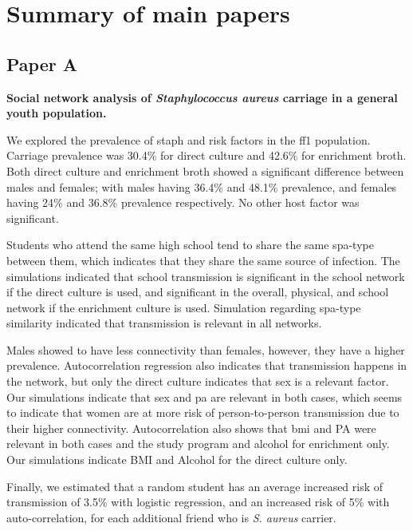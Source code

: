 \chapter{Summary of main papers}
\label{chapter:summay}
\section{Paper A}

\textbf{Social network analysis of \textit{Staphylococcus aureus} carriage in a general youth population.}

We explored the prevalence of \gls{staph} and risk factors in the \gls{ff1} population. Carriage prevalence was 30.4\% for direct culture and 42.6\% for enrichment broth. Both direct culture and enrichment broth showed a significant difference between males and females; with males having 36.4\% and 48.1\% prevalence, and females having 24\% and 36.8\% prevalence respectively. No other host factor was significant.

Students who attend the same high school tend to share the same \gls{spa}-type between them, which indicates that they share the same source of infection. The simulations indicated that school transmission is significant in the school network if the direct culture is used, and significant in the overall, physical, and school network if the enrichment culture is used. Simulation regarding \gls{spa}-type similarity indicated that transmission is relevant in all networks.

Males showed to have less connectivity than females, however, they have a higher prevalence. Autocorrelation regression also indicates that transmission happens in the network, but only the direct culture indicates that sex is a relevant factor. Our simulations indicate that sex and \gls{pa} are relevant in both cases, which seems to indicate that women are at more risk of person-to-person transmission due to their higher connectivity. Autocorrelation also shows that \gls{bmi} and PA were relevant in both cases and the study program and alcohol for enrichment only. Our simulations indicate BMI and Alcohol for the direct culture only.

Finally, we estimated that a random student has an average increased risk of transmission of 3.5\% with logistic regression, and an increased risk of 5\% with auto-correlation, for each additional friend who is \textit{S. aureus} carrier.


